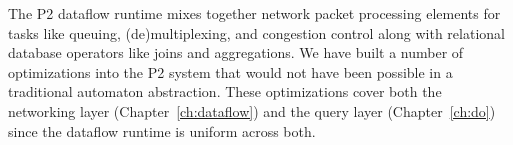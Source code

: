 The P2 dataflow runtime mixes together network packet processing elements
for tasks like queuing, (de)multiplexing, and congestion control along
with relational database operators like joins and aggregations. We have built
a number of optimizations into the P2 system that would not have been possible
in a traditional automaton abstraction. These optimizations cover both the networking
layer (Chapter~\ref{ch:dataflow}) and the query layer (Chapter~\ref{ch:do}) since
the dataflow runtime is uniform across both. 


% 
% 
% 
